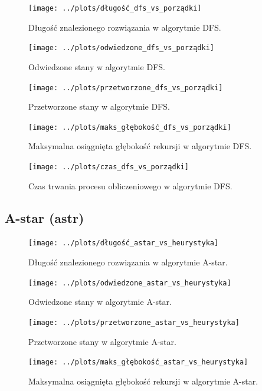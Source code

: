 \documentclass{classrep}
\begin{document}
    \begin{figure}[!h]
        \centering
        \texttt{[image: ../plots/długość\_dfs\_vs\_porządki]}
        \caption{Długość znalezionego rozwiązania w algorytmie DFS.}
        \label{fig:dfs-dlugosc}
        \texttt{[image: ../plots/odwiedzone\_dfs\_vs\_porządki]}
        \caption{Odwiedzone stany w algorytmie DFS.}
        \label{fig:dfs-odwiedzone}
    \end{figure}

    \begin{figure}[!h]
        \centering
        \texttt{[image: ../plots/przetworzone\_dfs\_vs\_porządki]}
        \caption{Przetworzone stany w algorytmie DFS.}
        \label{fig:dfs-przetworzone}
        \texttt{[image: ../plots/maks\_głębokość\_dfs\_vs\_porządki]}
        \caption{Maksymalna osiągnięta głębokość rekursji w algorytmie DFS.}
        \label{fig:dfs-max-depth}
    \end{figure}

    \begin{figure}[!h]
        \centering
        \texttt{[image: ../plots/czas\_dfs\_vs\_porządki]}
        \caption{Czas trwania procesu obliczeniowego w algorytmie DFS.}
        \label{fig:dfs-czas}
    \end{figure}

    \clearpage

    \subsection{A-star (astr)}\label{subsec:a-star-(astr)}
    \begin{figure}[!h]
        \centering
        \texttt{[image: ../plots/długość\_astar\_vs\_heurystyka]}
        \caption{Długość znalezionego rozwiązania w algorytmie A-star.}
        \label{fig:astar-dlugosc}
        \texttt{[image: ../plots/odwiedzone\_astar\_vs\_heurystyka]}
        \caption{Odwiedzone stany w algorytmie A-star.}
        \label{fig:astar-odwiedzone}
    \end{figure}

    \begin{figure}[!h]
        \centering
        \texttt{[image: ../plots/przetworzone\_astar\_vs\_heurystyka]}
        \caption{Przetworzone stany w algorytmie A-star.}
        \label{fig:astar-przetworzone}
        \texttt{[image: ../plots/maks\_głębokość\_astar\_vs\_heurystyka]}
        \caption{Maksymalna osiągnięta głębokość rekursji w algorytmie A-star.}
        \label{fig:astar-max-depth}
    \end{figure}
\end{document}
